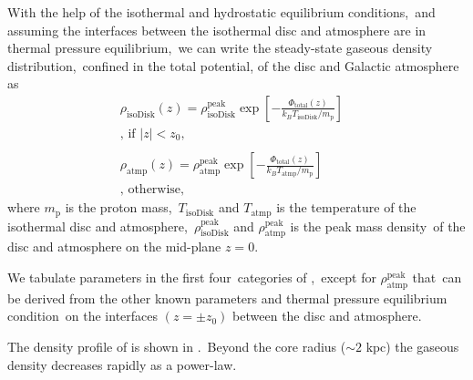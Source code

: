 \documentclass[twocolumn]{aastex631}
\begin{document}
  With the help of the isothermal and hydrostatic equilibrium conditions,\
  and assuming the interfaces between the isothermal disc and atmosphere are in thermal pressure equilibrium,\
  we can write the steady-state gaseous density distribution,\
  confined in the total potential, of the disc and  Galactic atmosphere as\
  \begin{subequations}
  \begin{align}
     \displaystyle \rho_{\text{isoDisk}}(z) = \rho_{\text{isoDisk}}^{\text{peak}}
     \exp\left[-\frac{\Phi_{\text{total}}(z)}{k_{B}T_{\text{isoDisk}}/m_{\text{p}}}\right]&\label{isothermal-disc-density}\\
     \text{, if $|z| < z_{0}$,}& \nonumber \\
     \nonumber\\
     \displaystyle \rho_{\text{atmp}}(z) = \rho_{\text{atmp}}^{\text{peak}}
     \exp\left[-\frac{\Phi_{\text{total}}(z)}{k_{B}T_{\text{atmp}}/m_{\text{p}}}\right]&\label{isothermal-atmp-density}\\
     \text{, otherwise,}& \nonumber
  \end{align}
  \label{disc-atm-sys}
  \end{subequations}
  where $m_{\text{p}}$ is the proton mass,\
  $T_{\text{isoDisk}}$ and $T_{\text{atmp}}$ is the temperature of the isothermal disc and atmosphere,\
  $\rho_{\text{isoDisk}}^{\text{peak}}$ and $\rho_{\text{atmp}}^{\text{peak}}$ is the peak mass density\
  of the disc and atmosphere on the mid-plane $z=0$.

  We tabulate parameters in the first four\
  categories of ,\
  except for $\rho_{\text{atmp}}^{\text{peak}}$ that\
  can be derived from the other known parameters and thermal pressure equilibrium condition\
  on the interfaces $(z=\pm z_{0})$ between the disc and atmosphere.\

  The density profile of \Cref{disc-atm-sys} is shown in .\
  Beyond the core radius ($\sim 2 \text{ kpc}$) the gaseous density decreases rapidly as a power-law.

%
\end{document}
